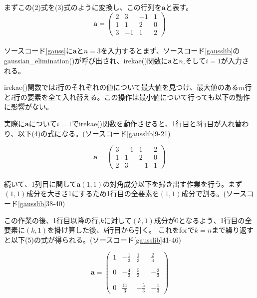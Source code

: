 \documentclass[a4paper,11pt]{jsarticle}
\begin{document}
まずこの(2)式を(3)式のように変換し、この行列を$\textbf{a}$と表す。
\begin{equation}
    \textbf{a} = 
    \left (
    \begin{array}{ccc|c}
        2 & 3 & -1 & 1\\
        1 & 1 & 2 & 0\\
        3 & -1 & 1 & 2
    \end{array}
    \right )
\end{equation}
\\

ソースコード\ref{gauss}に$\textbf{a}$と$n=3$を入力するとまず、ソースコード\ref{gausslib}のgaussian\_elimination()が呼び出され、irekae()関数に$\textbf{a}$と$n$,そして$i=1$が入力される。

irekae()関数ではi行のそれぞれの値について最大値を見つけ、最大値のある$m$行と$i$行の要素を全て入れ替える。この操作は最小値について行っても以下の動作に影響がない。

実際に$\textbf{a}$について$i=1$でirekae()関数を動作させると、1行目と3行目が入れ替わり、以下(4)の式になる。(ソースコード\ref{gausslib}9-21)

\begin{equation}
    \textbf{a} = 
    \left (
    \begin{array}{ccc|c}
        3 & -1 & 1 & 2\\
        1 & 1 & 2 & 0\\
        2 & 3 & -1 & 1
    \end{array}
    \right )
\end{equation}
\\

続いて、1列目に関して$\textbf{a}(1,1)$の対角成分以下を掃き出す作業を行う。まず$(1,1)$成分を大きさ1にするため1行目の全要素を$(1,1)$成分で割る。(ソースコード\ref{gausslib}38-40)

この作業の後、1行目以降の行,$k$に対して$(k,1)$成分が0となるよう、1行目の全要素に$(k,1)$を掛け算した後、$k$行目から引く。
これをforで$k=n$まで繰り返すと以下(5)の式が得られる。(ソースコード\ref{gausslib}41-46)

\begin{equation}
    \textbf{a} = 
    \left (
    \begin{array}{ccc|c}
        1 & \displaystyle -\frac{1}{3} & \displaystyle \frac{1}{3} & \displaystyle \frac{2}{3} \\ \\
        0 & \displaystyle -\frac{4}{3} & \displaystyle \frac{5}{3} & \displaystyle -\frac{2}{3} \\ \\
        0 & \displaystyle \frac{11}{3} & \displaystyle -\frac{5}{3} & \displaystyle -\frac{1}{3}
    \end{array}
    \right )
\end{equation}
\\
\end{document}
